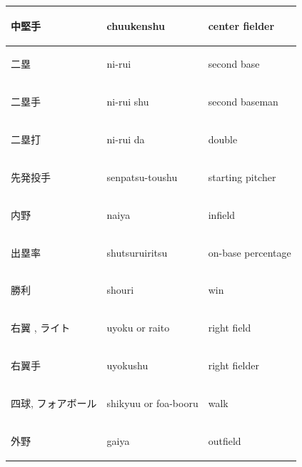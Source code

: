 \begin{tabular}{lll}
			\begin{CJK}{UTF8}{min}中堅手 \end{CJK} &chuukenshu                     & center fielder      \\\hline
			\begin{CJK}{UTF8}{min}二塁 \end{CJK} &ni-rui                          & second base         \\\hline
			\begin{CJK}{UTF8}{min}二塁手 \end{CJK} &ni-rui shu                     & second baseman      \\\hline
			\begin{CJK}{UTF8}{min}二塁打 \end{CJK} &ni-rui da                      & double              \\\hline
			\begin{CJK}{UTF8}{min}先発投手 \end{CJK} &senpatsu-toushu               & starting pitcher    \\\hline
			\begin{CJK}{UTF8}{min}内野 \end{CJK} &naiya                           & infield             \\\hline
			\begin{CJK}{UTF8}{min}出塁率 \end{CJK} &shutsuruiritsu                 & on-base percentage  \\\hline
			\begin{CJK}{UTF8}{min}勝利 \end{CJK} &shouri                          & win                 \\\hline
			\begin{CJK}{UTF8}{min}右翼 , ライト \end{CJK} &uyoku or raito            & right field         \\\hline
			\begin{CJK}{UTF8}{min}右翼手 \end{CJK} &uyokushu                       & right fielder       \\\hline
			\begin{CJK}{UTF8}{min}四球, フォアボール \end{CJK} &shikyuu or foa-booru    & walk                \\\hline
			\begin{CJK}{UTF8}{min}外野 \end{CJK} &gaiya                           & outfield            \\\hline

\end{tabular}

